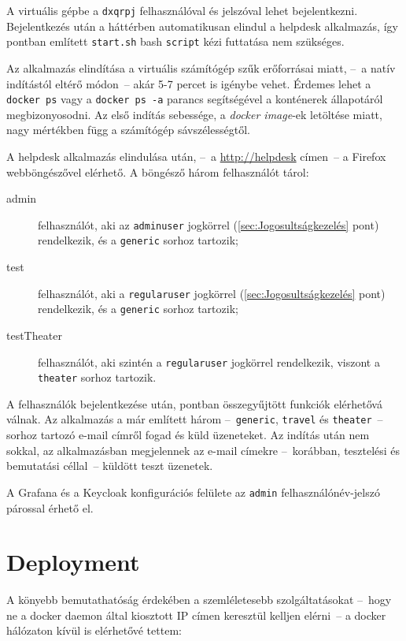 A virtuális gépbe a \texttt{dxqrpj} felhasználóval és jelszóval lehet bejelentkezni. Bejelentkezés után a háttérben automatikusan elindul a helpdesk alkalmazás, így  pontban említett \texttt{start.sh} bash \texttt{script} kézi futtatása nem szükséges.

Az alkalmazás elindítása a virtuális számítógép szűk erőforrásai miatt, --~a natív indítástól eltérő módon~-- akár 5-7 percet is igénybe vehet. Érdemes lehet a \texttt{docker~ps} vagy a \texttt{docker~ps~-a} parancs segítségével a konténerek állapotáról megbizonyosodni. Az első indítás sebessége, a \emph{docker image}-ek letöltése miatt, nagy mértékben függ a számítógép sávszélességtől.

A helpdesk alkalmazás elindulása után, --~a \href{http://helpdesk}{http://helpdesk} címen~-- a Firefox webböngészővel elérhető. A böngésző három felhasználót tárol:
\begin{description}
	\item[admin] felhasználót, aki az \texttt{admin\textunderscore user} jogkörrel (\ref{sec:Jogosultságkezelés} pont) rendelkezik, és a \texttt{generic} sorhoz tartozik;
	\item[test] felhasználót, aki a \texttt{regular\textunderscore user} jogkörrel (\ref{sec:Jogosultságkezelés} pont) rendelkezik, és a \texttt{generic} sorhoz tartozik;
	\item[testTheater] felhasználót, aki szintén a \texttt{regular\textunderscore user} jogkörrel rendelkezik, viszont a \texttt{theater} sorhoz tartozik.
\end{description}
 
A felhasználók bejelentkezése után,  pontban összegyűjtött funkciók elérhetővá válnak. Az alkalmazás a már említett három --~\texttt{generic}, \texttt{travel} és \texttt{theater}~-- sorhoz tartozó e-mail címről fogad és küld üzeneteket. Az indítás után nem sokkal, az alkalmazásban megjelennek az e-mail címekre --~korábban, tesztelési és bemutatási céllal~-- küldött teszt üzenetek.

A Grafana és a Keycloak konfigurációs felülete az \texttt{admin} felhasználónév-jelszó párossal érhető el.

\section{Deployment}
A könyebb bemutathatóság érdekében a szemléletesebb szolgáltatásokat --~hogy ne a docker daemon által kiosztott IP címen keresztül kelljen elérni~-- a docker hálózaton kívül is elérhetővé tettem:




